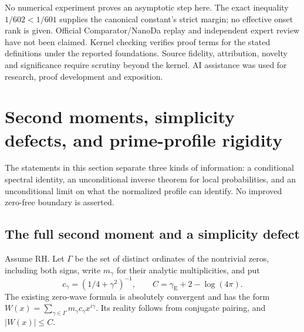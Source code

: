 \documentclass[11pt]{article}
\theoremstyle{definition}
\begin{document}
No numerical experiment proves an asymptotic step here.
The exact inequality $1/602<1/601$ supplies the canonical
constant's strict margin; no effective onset rank is given.
Official Comparator/NanoDa replay and independent expert review
have not been claimed. Kernel checking verifies proof terms
for the stated definitions under the reported foundations.
Source fidelity, attribution, novelty and significance require
scrutiny beyond the kernel. AI assistance was used for research,
proof development and exposition.

\section{Second moments, simplicity defects, and prime-profile rigidity}
\label{sec:moment-rigidity}

The statements in this section separate three kinds of information: a
conditional spectral identity, an unconditional inverse theorem for local
probabilities, and an unconditional limit on what the normalized profile
can identify. No improved zero-free boundary is asserted.

\subsection{The full second moment and a simplicity defect}

Assume RH. Let $\Gamma$ be the set of distinct ordinates of the nontrivial
zeros, including both signs, write $m_\gamma$ for their analytic
multiplicities, and put
\[
 c_\gamma=(1/4+\gamma^2)^{-1},\qquad
 C=\gamma_{\mathrm E}+2-\log(4\pi).
\]
The existing zero-wave formula is absolutely convergent and has the form
$W(x)=\sum_{\gamma\in\Gamma}m_\gamma c_\gamma x^{i\gamma}$.
Its reality follows from conjugate pairing, and $|W(x)|\le C$.
\end{document}

